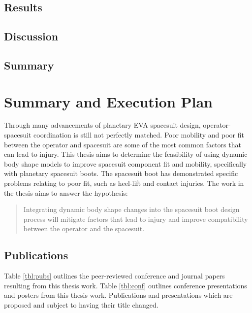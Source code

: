 \documentclass[defaultstyle,11pt]{comps}
\begin{document}
\hypertarget{results-3}{%
\section{Results}\label{results-3}}

\hypertarget{discussion}{%
\section{Discussion}\label{discussion}}

\hypertarget{summary-6}{%
\section{Summary}\label{summary-6}}

\hypertarget{summary-and-execution-plan}{%
\chapter{Summary and Execution Plan}\label{summary-and-execution-plan}}

Through many advancements of planetary EVA spacesuit design, operator-spacesuit coordination is still not perfectly matched.
Poor mobility and poor fit between the operator and spacesuit are some of the most common factors that can lead to injury.
This thesis aims to determine the feasibility of using dynamic body shape models to improve spacesuit component fit and mobility, specifically with planetary spacesuit boots.
The spacesuit boot has demonstrated specific problems relating to poor fit, such as heel-lift and contact injuries.
The work in the thesis aims to answer the hypothesis:

\begin{quote}
Integrating dynamic body shape changes into the spacesuit boot design process will mitigate factors that lead to injury and improve compatibility between the operator and the spacesuit.
\end{quote}

\hypertarget{publications}{%
\section{Publications}\label{publications}}

Table \ref{tbl:pubs} outlines the peer-reviewed conference and journal papers resulting from this thesis work.
Table \ref{tbl:conf} outlines conference presentations and posters from this thesis work.
Publications and presentations which are proposed and subject to having their title changed.
\end{document}
